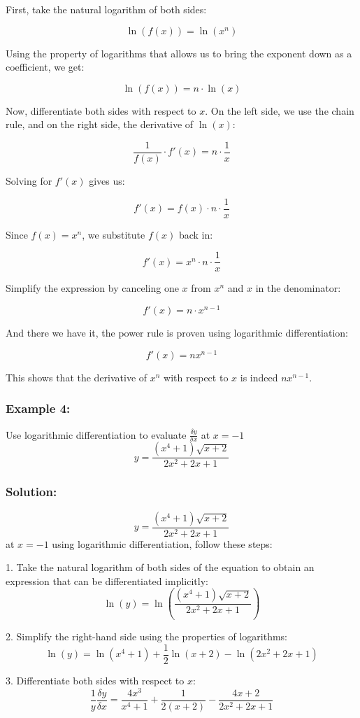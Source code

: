 \documentclass{article}
\begin{document}
First, take the natural logarithm of both sides:

$$\ln(f(x)) = \ln(x^n)$$

Using the property of logarithms that allows us to bring the exponent down as a coefficient, we get:

$$\ln(f(x)) = n \cdot \ln(x)$$

Now, differentiate both sides with respect to $x$. On the left side, we use the chain rule, and on the right side, the derivative of $\ln(x)$:

$$\frac{1}{f(x)} \cdot f'(x) = n \cdot \frac{1}{x}$$

Solving for $f'(x)$ gives us:

$$f'(x) = f(x) \cdot n \cdot \frac{1}{x}$$

Since $f(x) = x^n$, we substitute $f(x)$ back in:

$$f'(x) = x^n \cdot n \cdot \frac{1}{x}$$

Simplify the expression by canceling one $x$ from $x^n$ and $x$ in the denominator:

$$f'(x) = n \cdot x^{n-1}$$

And there we have it, the power rule is proven using logarithmic differentiation:

$$f'(x) = nx^{n-1}$$

This shows that the derivative of $x^n$ with respect to $x$ is indeed $nx^{n-1}$.

\subsubsection*{Example 4:}
Use logarithmic differentiation to evaluate $\frac{\delta y}{\delta x}$ at $x=-1$ $$y=\frac{(x^4+1)\sqrt{x+2}}{2x^2+2x+1}$$
\subsubsection*{Solution:}

 $$y=\frac{(x^4+1)\sqrt{x+2}}{2x^2+2x+1}$$ at $x=-1$ using logarithmic differentiation, follow these steps:

1. Take the natural logarithm of both sides of the equation to obtain an expression that can be differentiated implicitly:
   $$\ln(y) = \ln\left(\frac{(x^4+1)\sqrt{x+2}}{2x^2+2x+1}\right)$$

2. Simplify the right-hand side using the properties of logarithms:
   $$\ln(y) = \ln(x^4+1) + \frac{1}{2}\ln(x+2) - \ln(2x^2+2x+1)$$

3. Differentiate both sides with respect to $x$:
   $$\frac{1}{y}\frac{\delta y}{\delta x} = \frac{4x^3}{x^4+1} + \frac{1}{2(x+2)} - \frac{4x+2}{2x^2+2x+1}$$
\end{document}
